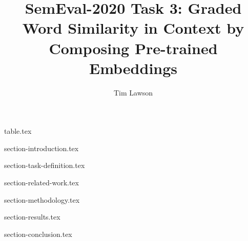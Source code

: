 \documentclass[11pt]{article}
\begin{document}
\title{SemEval-2020 Task 3: Graded Word Similarity in Context by Composing Pre-trained Embeddings}
\author[]{Tim Lawson}
\date{}

\maketitle

{table.tex}

{section-introduction.tex}

{section-task-definition.tex}

{section-related-work.tex}

{section-methodology.tex}

{section-results.tex}

{section-conclusion.tex}

\printbibliography
\end{document}
